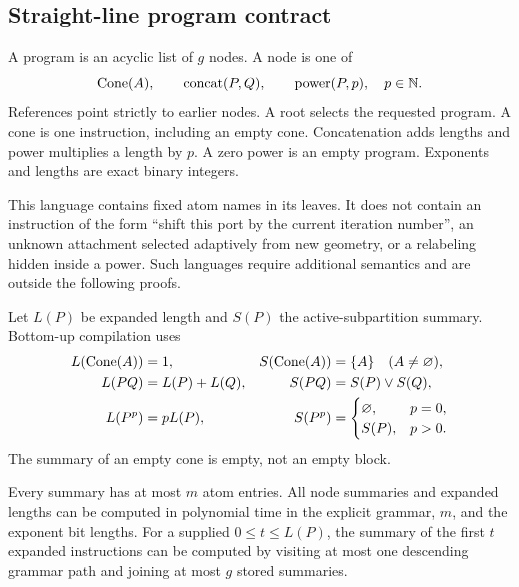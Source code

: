 \subsection{Straight-line program contract}

A program is an acyclic list of $g$ nodes. A node is one of
\[
 \operatorname{Cone}(A),\qquad \operatorname{concat}(P,Q),\qquad
 \operatorname{power}(P,p),\quad p\in\mathbb N.
\]
References point strictly to earlier nodes. A root selects the requested
program. A cone is one instruction, including an empty cone. Concatenation
adds lengths and power multiplies a length by $p$. A zero power is an empty
program. Exponents and lengths are exact binary integers.

This language contains fixed atom names in its leaves. It does not contain
an instruction of the form ``shift this port by the current iteration
number'', an unknown attachment selected adaptively from new geometry, or
a relabeling hidden inside a power. Such languages require additional
semantics and are outside the following proofs.

Let $L(P)$ be expanded length and $S(P)$ the active-subpartition summary.
Bottom-up compilation uses
\begin{align*}
 L(\operatorname{Cone}(A))&=1,&S(\operatorname{Cone}(A))&=\{A\}\quad(A\ne\varnothing),\\
 L(PQ)&=L(P)+L(Q),&S(PQ)&=S(P)\vee S(Q),\\
 L(P^p)&=pL(P),&S(P^p)&=
 \begin{cases}\varnothing,&p=0,\\S(P),&p>0.\end{cases}
\end{align*}
The summary of an empty cone is empty, not an empty block.

\begin{proposition}
\label{prop:prefix}
Every summary has at most $m$ atom entries. All node summaries and expanded
lengths can be computed in polynomial time in the explicit grammar, $m$,
and the exponent bit lengths. For a supplied $0\le t\le L(P)$, the summary
of the first $t$ expanded instructions can be computed by visiting at most
one descending grammar path and joining at most $g$ stored summaries.
\end{proposition}

